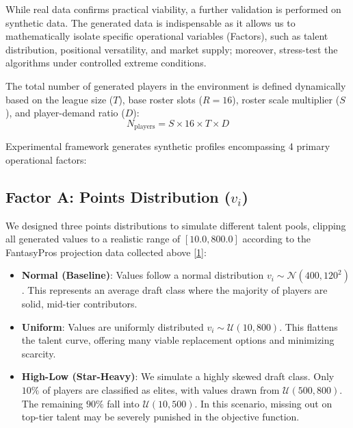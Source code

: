 \documentclass[11pt,a4paper]{article}
\begin{document}
While real data confirms practical viability, a further validation is performed on synthetic data. The generated data is indispensable as it allows us to mathematically isolate specific operational variables (Factors), such as talent distribution, positional versatility, and market supply; moreover, stress-test the algorithms under controlled extreme conditions. 

The total number of generated players in the environment is defined dynamically based on the league size ($T$), base roster slots ($R = 16$), roster scale multiplier ($S$), and player-demand ratio ($D$): 
\[ N_{\text{players}} = S \times 16 \times T \times D \]

Experimental framework generates synthetic profiles encompassing 4 primary operational factors:

\subsection{Factor A: Points Distribution (\texorpdfstring{$v_i$}{vi})}
We designed three points distributions to simulate different talent pools, clipping all generated values to a realistic range of $[10.0, 800.0]$ according to the FantasyPros projection data collected above \hyperref[ref:fantasypros-proj]{[1]}:
\begin{itemize}[leftmargin=1.5em]
    \item \textbf{Normal (Baseline)}: Values follow a normal distribution $v_i \sim \mathcal{N}(400, 120^2)$. This represents an average draft class where the majority of players are solid, mid-tier contributors.
    \item \textbf{Uniform}: Values are uniformly distributed $v_i \sim \mathcal{U}(10, 800)$. This flattens the talent curve, offering many viable replacement options and minimizing scarcity.
    \item \textbf{High-Low (Star-Heavy)}: We simulate a highly skewed draft class. Only $10\%$ of players are classified as elites, with values drawn from $\mathcal{U}(500, 800)$. The remaining $90\%$ fall into $\mathcal{U}(10, 500)$. In this scenario, missing out on top-tier talent may be severely punished in the objective function.
\end{itemize}
\end{document}
